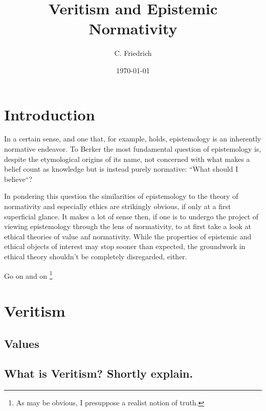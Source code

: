 \documentclass[12pt,numbers=noenddot]{scrartcl}
\title{Veritism and Epistemic Normativity}
\author{C. Friedrich}
\date{\today}
\begin{document}
\begin{titlepage}
\maketitle


\thispagestyle{empty}
\end{titlepage}

\tableofcontents
\newpage

\section{Introduction}

In a certain sense, and one that, for example, \textcite{Berker2013-BERETA-2} holds, epistemology is an inherently normative endeavor. To Berker the most fundamental question of epistemology is, despite the etymological origins of its name, not concerned with what makes a belief count as knowledge but is instead purely normative: “What should I believe“?

In pondering this question the similarities of epistemology to the theory of normativity and especially ethics are strikingly obvious, if only at a first superficial glance. It makes a lot of sense then, if one is to undergo the project of viewing epistemology through the lens of normativity, to at first take a look at ethical theories of value anf normativity. While the properties of epistemic and ethical objects of interest may stop sooner than expected, the groundwork in ethical theory shouldn't be completely disregarded, either.

Go on and on
\footnote{As may be obvious, I presuppose a realist notion of truth.}
\section{Veritism}

\subsection{Values}
\subsection{ What is Veritism? Shortly explain.}
\end{document}
